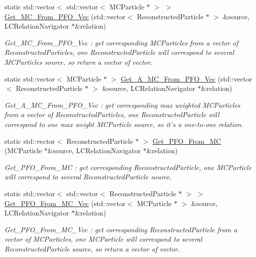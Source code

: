 \begin{DoxyCompactItemize}
static std::vector$<$ std::vector$<$ MCParticle $\ast$ $>$ $>$ \hyperlink{classToolSet_1_1CRC_a09c33fa93c99c29e9157bf915625108a}{Get\_\-MC\_\-From\_\-PFO\_\-Vec} (std::vector$<$ ReconstructedParticle $\ast$ $>$ \&source, LCRelationNavigator $\ast$\&relation)
\begin{DoxyCompactList}\small\item\em Get\_\-MC\_\-From\_\-PFO\_\-Vec : get corresponding MCParticles from a vector of ReconstructedParticles, one ReconstructedParticle will correspond to several MCParticles source, so return a vector of vector. \item\end{DoxyCompactList}\item 
static std::vector$<$ MCParticle $\ast$ $>$ \hyperlink{classToolSet_1_1CRC_acab3f644700643fa2b2967365748d0df}{Get\_\-A\_\-MC\_\-From\_\-PFO\_\-Vec} (std::vector$<$ ReconstructedParticle $\ast$ $>$ \&source, LCRelationNavigator $\ast$\&relation)
\begin{DoxyCompactList}\small\item\em Get\_\-A\_\-MC\_\-From\_\-PFO\_\-Vec : get corresponding max weighted MCParticles from a vector of ReconstructedParticles, one ReconstructedParticle will correspond to one max weight MCParticle source, so it's a one-\/to-\/one relation. \item\end{DoxyCompactList}\item 
static std::vector$<$ ReconstructedParticle $\ast$ $>$ \hyperlink{classToolSet_1_1CRC_a1e8af238303782e448edc47f58fb01ab}{Get\_\-PFO\_\-From\_\-MC} (MCParticle $\ast$\&source, LCRelationNavigator $\ast$\&relation)
\begin{DoxyCompactList}\small\item\em Get\_\-PFO\_\-From\_\-MC : get corresponding ReconstructedParticle, one MCParticle will correspond to several ReconstructedParticle source. \item\end{DoxyCompactList}\item 
static std::vector$<$ std::vector$<$ ReconstructedParticle $\ast$ $>$ $>$ \hyperlink{classToolSet_1_1CRC_adb838e10bbaaabbcc8bba3b2cf3b67f8}{Get\_\-PFO\_\-From\_\-MC\_\-Vec} (std::vector$<$ MCParticle $\ast$ $>$ \&source, LCRelationNavigator $\ast$\&relation)
\begin{DoxyCompactList}\small\item\em Get\_\-PFO\_\-From\_\-MC\_\-Vec : get corresponding ReconstructedParticle from a vector of MCParticles, one MCParticle will correspond to several ReconstructedParticle source, so return a vector of vector. \item\end{DoxyCompactList}\item 

\end{DoxyCompactItemize}
